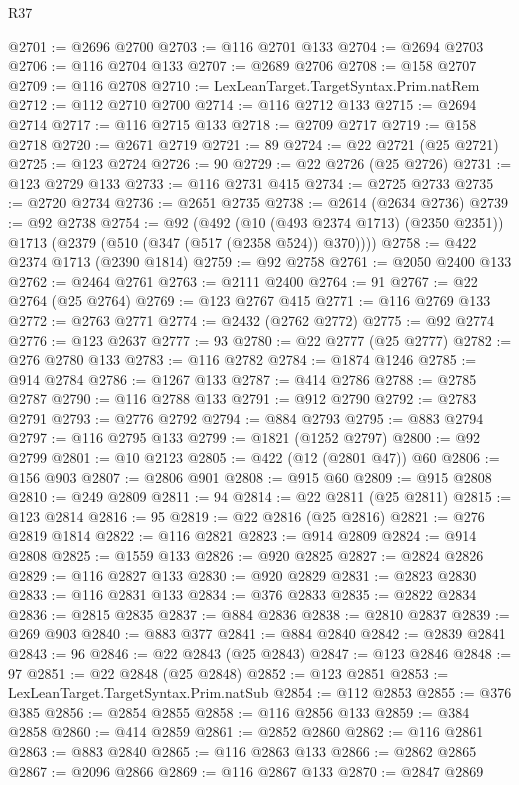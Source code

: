 \begin{lexlean}{R37}
\begin{coremodule}
@2701 := @2696 @2700
@2703 := @116 @2701 @133
@2704 := @2694 @2703
@2706 := @116 @2704 @133
@2707 := @2689 @2706
@2708 := @158 @2707
@2709 := @116 @2708
@2710 := LexLeanTarget.TargetSyntax.Prim.natRem
@2712 := @112 @2710 @2700
@2714 := @116 @2712 @133
@2715 := @2694 @2714
@2717 := @116 @2715 @133
@2718 := @2709 @2717
@2719 := @158 @2718
@2720 := @2671 @2719
@2721 := 89
@2724 := @22 @2721 (@25 @2721)
@2725 := @123 @2724
@2726 := 90
@2729 := @22 @2726 (@25 @2726)
@2731 := @123 @2729 @133
@2733 := @116 @2731 @415
@2734 := @2725 @2733
@2735 := @2720 @2734
@2736 := @2651 @2735
@2738 := @2614 (@2634 @2736)
@2739 := @92 @2738
@2754 := @92
    (@492
      (@10 (@493 @2374 @1713) (@2350 @2351))
      @1713
      (@2379 (@510 (@347 (@517 (@2358 @524)) @370))))
@2758 := @422 @2374 @1713 (@2390 @1814)
@2759 := @92 @2758
@2761 := @2050 @2400 @133
@2762 := @2464 @2761
@2763 := @2111 @2400
@2764 := 91
@2767 := @22 @2764 (@25 @2764)
@2769 := @123 @2767 @415
@2771 := @116 @2769 @133
@2772 := @2763 @2771
@2774 := @2432 (@2762 @2772)
@2775 := @92 @2774
@2776 := @123 @2637
@2777 := 93
@2780 := @22 @2777 (@25 @2777)
@2782 := @276 @2780 @133
@2783 := @116 @2782
@2784 := @1874 @1246
@2785 := @914 @2784
@2786 := @1267 @133
@2787 := @414 @2786
@2788 := @2785 @2787
@2790 := @116 @2788 @133
@2791 := @912 @2790
@2792 := @2783 @2791
@2793 := @2776 @2792
@2794 := @884 @2793
@2795 := @883 @2794
@2797 := @116 @2795 @133
@2799 := @1821 (@1252 @2797)
@2800 := @92 @2799
@2801 := @10 @2123
@2805 := @422 (@12 (@2801 @47)) @60
@2806 := @156 @903
@2807 := @2806 @901
@2808 := @915 @60
@2809 := @915 @2808
@2810 := @249 @2809
@2811 := 94
@2814 := @22 @2811 (@25 @2811)
@2815 := @123 @2814
@2816 := 95
@2819 := @22 @2816 (@25 @2816)
@2821 := @276 @2819 @1814
@2822 := @116 @2821
@2823 := @914 @2809
@2824 := @914 @2808
@2825 := @1559 @133
@2826 := @920 @2825
@2827 := @2824 @2826
@2829 := @116 @2827 @133
@2830 := @920 @2829
@2831 := @2823 @2830
@2833 := @116 @2831 @133
@2834 := @376 @2833
@2835 := @2822 @2834
@2836 := @2815 @2835
@2837 := @884 @2836
@2838 := @2810 @2837
@2839 := @269 @903
@2840 := @883 @377
@2841 := @884 @2840
@2842 := @2839 @2841
@2843 := 96
@2846 := @22 @2843 (@25 @2843)
@2847 := @123 @2846
@2848 := 97
@2851 := @22 @2848 (@25 @2848)
@2852 := @123 @2851
@2853 := LexLeanTarget.TargetSyntax.Prim.natSub
@2854 := @112 @2853
@2855 := @376 @385
@2856 := @2854 @2855
@2858 := @116 @2856 @133
@2859 := @384 @2858
@2860 := @414 @2859
@2861 := @2852 @2860
@2862 := @116 @2861
@2863 := @883 @2840
@2865 := @116 @2863 @133
@2866 := @2862 @2865
@2867 := @2096 @2866
@2869 := @116 @2867 @133
@2870 := @2847 @2869

\end{coremodule}
\end{lexlean}
